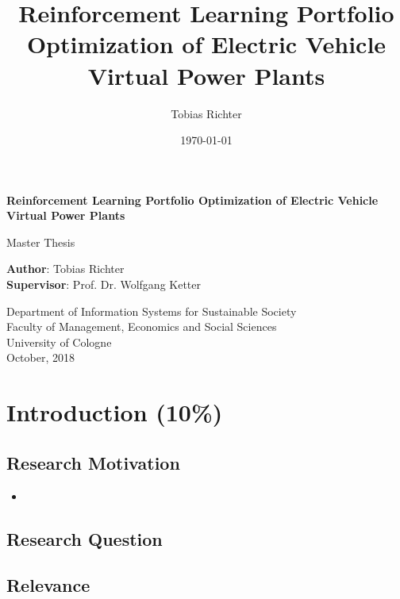 \documentclass[12pt, article]{article}
\author{Tobias Richter}
\date{\today}
\title{Reinforcement Learning Portfolio Optimization of Electric Vehicle Virtual Power Plants}
\begin{document}
\begin{titlepage}
    \begin{center}
        \vspace*{1cm}

        \Large
        \textbf{Reinforcement Learning Portfolio Optimization of Electric Vehicle Virtual Power Plants}

        \vspace{1.5cm}
        Master Thesis

        \vspace{8.0cm}

        \large
        \textbf{Author}: Tobias Richter\\
        \large
        \textbf{Supervisor}: Prof. Dr. Wolfgang Ketter

        \vspace{1cm}
        \large
        Department of Information Systems for Sustainable Society\\
        Faculty of Management, Economics and Social Sciences\\
        University of Cologne\\

        \vspace{1cm}
        October, 2018

    \end{center}
\end{titlepage}
\setcounter{page}{2}

\tableofcontents
\clearpage
\listoffigures
\clearpage
\listoftables
\clearpage
{}

\section{Introduction (10\%)}
\label{sec:org574db38}
\subsection{Research Motivation}
\label{sec:orgc5882fe}
\begin{itemize}
\item \cite{lopes11_integ_elect_vehic_elect_power_system}
\end{itemize}
\subsection{Research Question}
\label{sec:org1b1eb24}
\subsection{Relevance}
\label{sec:org2d14179}
\end{document}
